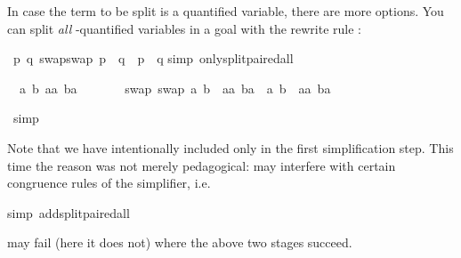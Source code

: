 \begin{isabellebody}
\begin{isamarkuptxt}
In case the term to be split is a quantified variable, there are more options.
You can split \emph{all} \isa{{\isasymAnd}}-quantified variables in a goal
with the rewrite rule :%
\end{isamarkuptxt}%
\ {\isachardoublequote}{\isasymAnd}p\ q{\isachardot}\ swap{\isacharparenleft}swap\ p{\isacharparenright}\ {\isacharequal}\ q\ {\isasymlongrightarrow}\ p\ {\isacharequal}\ q{\isachardoublequote}\isanewline
{}simp\ only{\isacharcolon}split{\isacharunderscore}paired{\isacharunderscore}all{\isacharparenright}%
\begin{isamarkuptxt}%
\noindent
\begin{isabelle}%
\ {}{\isachardot}\ {\isasymAnd}a\ b\ aa\ ba{\isachardot}\isanewline
\ \ \ \ \ \ \ swap\ {\isacharparenleft}swap\ {\isacharparenleft}a{\isacharcomma}\ b{\isacharparenright}{\isacharparenright}\ {\isacharequal}\ {\isacharparenleft}aa{\isacharcomma}\ ba{\isacharparenright}\ {\isasymlongrightarrow}\ {\isacharparenleft}a{\isacharcomma}\ b{\isacharparenright}\ {\isacharequal}\ {\isacharparenleft}aa{\isacharcomma}\ ba{\isacharparenright}%
\end{isabelle}%
\end{isamarkuptxt}%
\ simp\isanewline
{}%
\begin{isamarkuptext}%
\noindent
Note that we have intentionally included only 
in the first simplification step. This time the reason was not merely
pedagogical:
 may interfere with certain congruence
rules of the simplifier, i.e.%
\end{isamarkuptext}%
simp\ add{\isacharcolon}split{\isacharunderscore}paired{\isacharunderscore}all{\isacharparenright}%
\begin{isamarkuptext}%
\noindent
may fail (here it does not) where the above two stages succeed.


\end{isamarkuptext}
\end{isabellebody}
